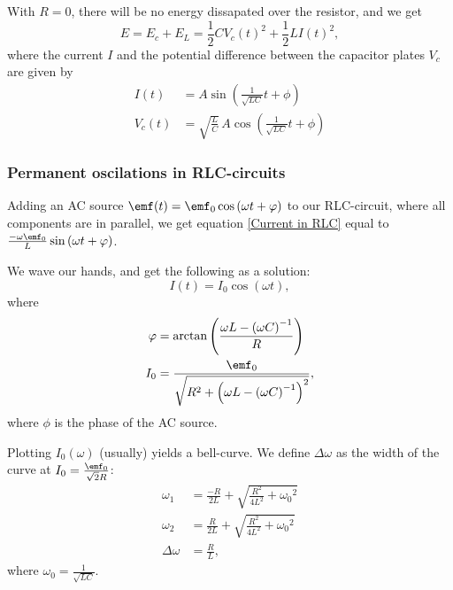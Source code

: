         With $R=0$, there will be no energy dissapated over the resistor, and we get 
        \begin{equation*}
            E = E_c + E_L = \frac{1}{2}C{V_c(t)}^2 + \frac{1}{2}L{I(t)}^2,
        \end{equation*}
        where the current $I$ and the potential difference between the capacitor plates $V_c$ are given by 
        \begin{align*}
            I(t) &= A\sin\left(\frac{1}{\sqrt{LC}}t + \phi\right) \\
            V_c (t) &= \sqrt{\frac{L}{C}} \, A\cos\left(\frac{1}{\sqrt{LC}}t + \phi\right)
        \end{align*}

    \subsubsection{Permanent oscilations in RLC-circuits}

        Adding an AC source $\emf(t) = \emf_0\cos\left(\omega t + \phi\right)$ to our RLC-circuit, where all components are in parallel, 
        we get equation \eqref{Current in RLC} equal to $\frac{-\omega\emf_0}{L}\sin\left(\omega t + \phi\right)$.
        
        We wave our hands, and get the following as a solution: 
        \begin{equation}
            I(t) = I_0 \cos\left(\omega t\right),
        \end{equation}
        where 
        \begin{align*}
            \phi &= \text{arctan} \left(\frac{\omega L - \left(\omega C\right)^{-1}}{R}\right)\\
            I_0 &= \frac{\emf_0}{\sqrt{R^2 + \left(\omega L - \left(\omega C\right)^{-1}\right)^2}},
        \end{align*}
        where $\phi$ is the phase of the AC source.

        Plotting $I_0(\omega)$ (usually) yields a bell-curve. We define $\Delta\omega$ as the width of the curve at $I_0 = \frac{\emf_0}{\sqrt{2}R}$: 
        \begin{align*}
            \omega_1 &= \frac{-R}{2L} + \sqrt{\frac{R^2}{4L^2} + {\omega_0}^2}\\
            \omega_2 &= \frac{R}{2L} + \sqrt{\frac{R^2}{4L^2} + {\omega_0}^2}\\
            \Delta\omega &= \frac{R}{L},
        \end{align*}
        where $\omega_0 = \frac{1}{\sqrt{LC}}$.

